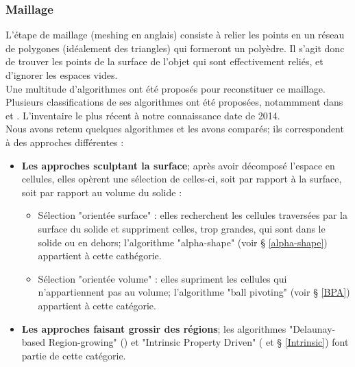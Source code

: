 \documentclass[a4paper,10pt]{report}
\begin{document}
\subsubsection{Maillage}
L'étape de maillage (meshing en anglais) consiste à relier les points en un réseau de polygones (idéalement des triangles) qui formeront un polyèdre. 
Il s'agit donc de trouver les points de la surface de l'objet qui sont effectivement reliés, et d'ignorer les espaces vides.\\
Une multitude d'algorithmes ont été proposés pour reconstituer ce maillage.
Plusieurs classifications de ses algorithmes ont été proposées, notammment dans \cite{Mencl} et \cite{IPD}. L'inventaire le plus récent à notre connaissance date de 2014\cite{Berger}.\\
Nous avons retenu quelques algorithmes et les avons comparés; ils correspondent à des approches différentes :
\begin{itemize}
\item \textbf{Les approches sculptant la surface}; après avoir décomposé l'espace en cellules, elles opèrent une sélection de celles-ci, soit par rapport à la surface, soit par rapport au volume du solide :
\begin{itemize}
\item Sélection "orientée surface" : elles recherchent les cellules traversées par la surface du solide et suppriment celles, trop grandes, qui sont dans le solide ou en dehors; l'algorithme "alpha-shape" (voir § \ref{alpha-shape}) appartient à cette cathégorie.
\item Sélection "orientée volume" : elles supriment les cellules qui n'appartiennent pas au volume; l'algorithme "ball pivoting" (voir § \ref{BPA}) appartient à cette catégorie.
\end{itemize}
\item \textbf{Les approches faisant grossir des régions}; les algorithmes "Delaunay-based Region-growing" (\cite{DBRG}) et "Intrinsic Property Driven" (\cite{IPD} et § \ref{Intrinsic}) font partie de cette catégorie.
\end{itemize}
\end{document}
